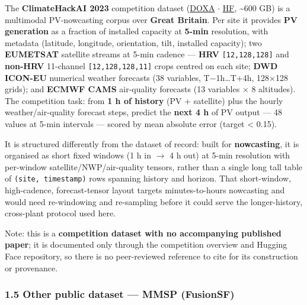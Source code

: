 \documentclass[
  9pt,
]{article}
\begin{document}
The \textbf{ClimateHackAI 2023} competition dataset
(\href{https://doxaai.com/competition/climatehackai-2023/overview}{DOXA}
\(\cdot\)
\href{https://huggingface.co/datasets/climatehackai/climatehackai-2023}{HF},
\textasciitilde600 GB) is a multimodal PV-nowcasting corpus over
\textbf{Great Britain}. Per site it provides \textbf{PV generation} as a
fraction of installed capacity at \textbf{5-min} resolution, with
metadata (latitude, longitude, orientation, tilt, installed capacity);
two \textbf{EUMETSAT} satellite streams at 5-min cadence ---
\textbf{HRV} \texttt{{[}12,128,128{]}} and \textbf{non-HRV} 11-channel
\texttt{{[}12,128,128,11{]}} crops centred on each site; \textbf{DWD
ICON-EU} numerical weather forecasts (38 variables, T\(-\)1h\ldots T+4h,
128\(\times\)128 grids); and \textbf{ECMWF CAMS} air-quality forecasts (13
variables \(\times\) 8 altitudes). The competition task: from \textbf{1 h of
history} (PV + satellite) plus the hourly weather/air-quality forecast
steps, predict the \textbf{next 4 h} of PV output --- 48 values at 5-min
intervals --- scored by mean absolute error (target \textless{} 0.15).

It is structured differently from the dataset of record: built for
\textbf{nowcasting}, it is organised as short fixed windows (1 h in \(\rightarrow\) 4
h out) at 5-min resolution with per-window satellite/NWP/air-quality
tensors, rather than a single long tall table of
\texttt{(site,\ timestamp)} rows spanning history and horizon. That
short-window, high-cadence, forecast-tensor layout targets
minutes-to-hours nowcasting and would need re-windowing and re-sampling
before it could serve the longer-history, cross-plant protocol used
here.

Note: this is a \textbf{competition dataset with no accompanying
published paper}; it is documented only through the competition overview
and Hugging Face repository, so there is no peer-reviewed reference to
cite for its construction or provenance.

\subsubsection{1.5 Other public dataset --- MMSP
(FusionSF)}\label{other-public-dataset-mmsp-fusionsf}
\end{document}

